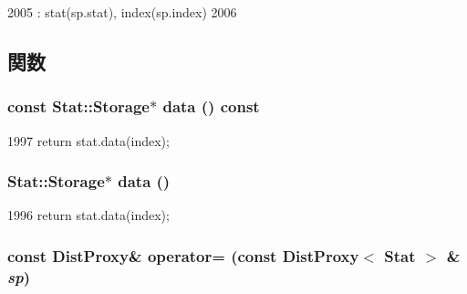 \begin{DoxyCode}
2005         : stat(sp.stat), index(sp.index)
2006     {}
\end{DoxyCode}


\subsection{関数}
\hypertarget{classStats_1_1DistProxy_a5025236c916e720264cddac3d4fc826d}{
\subsubsection[{data}]{\setlength{\rightskip}{0pt plus 5cm}const Stat::Storage$\ast$ data () const}}
\label{classStats_1_1DistProxy_a5025236c916e720264cddac3d4fc826d}



\begin{DoxyCode}
1997 { return stat.data(index); }
\end{DoxyCode}
\hypertarget{classStats_1_1DistProxy_a7ce67fb80d4a7446971407d9b350be5f}{
\subsubsection[{data}]{\setlength{\rightskip}{0pt plus 5cm}Stat::Storage$\ast$ data ()}}
\label{classStats_1_1DistProxy_a7ce67fb80d4a7446971407d9b350be5f}



\begin{DoxyCode}
1996 { return stat.data(index); }
\end{DoxyCode}
\hypertarget{classStats_1_1DistProxy_a43c66cb1a1220e52adc877f888c06265}{
\subsubsection[{operator=}]{\setlength{\rightskip}{0pt plus 5cm}const {\bf DistProxy}\& operator= (const {\bf DistProxy}$<$ Stat $>$ \& {\em sp})}}
\label{classStats_1_1DistProxy_a43c66cb1a1220e52adc877f888c06265}



